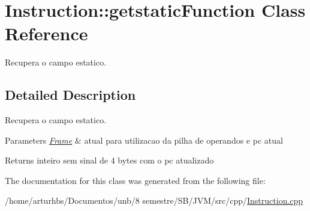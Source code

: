 \hypertarget{classInstruction_1_1getstaticFunction}{}\section{Instruction\+:\+:getstatic\+Function Class Reference}
\label{classInstruction_1_1getstaticFunction}


Recupera o campo estatico.  




\subsection{Detailed Description}
Recupera o campo estatico. 


\begin{DoxyParams}{Parameters}
{\em \hyperlink{classFrame}{Frame}} & atual para utilizacao da pilha de operandos e pc atual \\
\hline
\end{DoxyParams}
\begin{DoxyReturn}{Returns}
inteiro sem sinal de 4 bytes com o pc atualizado 
\end{DoxyReturn}


The documentation for this class was generated from the following file\+:\begin{DoxyCompactItemize}
\item 
/home/arturhbs/\+Documentos/unb/8 semestre/\+S\+B/\+J\+V\+M/src/cpp/\hyperlink{Instruction_8cpp}{Instruction.\+cpp}\end{DoxyCompactItemize}
